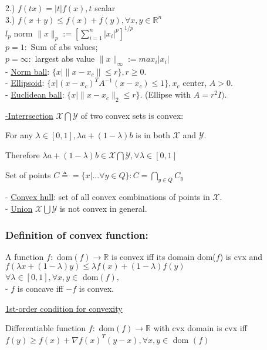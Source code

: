 \documentclass[10pt,parskip]{scrartcl}
\begin{document}
\begin{multicols*}{3}
 2.) $f(tx) = |t|f(x), t$ scalar\\
 3.) $f(x+y)\leq f(x) + f(y), \forall x, y \in \mathbb R^n$\\
 \hspace*{8mm}$l_p$ norm $\|x\|_p := [\sum_{i=1}^n |x_i|^p]^{1/p}$\\
  \hspace*{5mm}$p=1:$ Sum of abs values;\\
  \hspace*{5mm}$p=\infty:$ largest abs value $\|x\|_\infty:=max_i|x_i|$\\
- \underline{Norm ball}: $\{x | \| x-x_c\| \leq r\}, r \geq 0.$\\
- \underline{Ellipsoid}: $\{x | (x-x_c)^T A^{-1} (x-x_c)\leq 1\}, x_c$ center, $A>0$.\\
- \underline{Euclidean ball}: $\{x | \| x-x_c\|_2 \leq r\}$. (Ellipse with $A = r^2 I)$.


\underline{-Interrsection} $\mathcal X \bigcap \mathcal Y$ of two convex sets is convex:


For any $\lambda \in [0,1], \lambda a + (1-\lambda)b$ is in both $\mathcal X$ and $ \mathcal Y$. 

Therefore $\lambda a + (1-\lambda)b \in \mathcal X \bigcap \mathcal Y,  \forall \lambda \in [0,1]$ 

Set of points $ C \triangleq = \{x| ... \forall y \in Q\}: C = \bigcap_{y \in Q} C_y$

- \underline{Convex hull}: set of all convex combinations of points in $\mathcal X$.\\
- \underline{Union} $\mathcal X \bigcup \mathcal Y$ is not convex in general.


\subsubsection{Definition of convex function:}
A function $f :$ dom$(f) \rightarrow \mathbb R$ is convex iff its domain dom($f$) is cvx and
$ f( \lambda x + (1-\lambda) y) \leq \lambda f(x) + (1-\lambda) f(y)$\\
\hspace*{8mm}$  \forall \lambda \in [0,1], \forall x,y \in $ dom$(f),$\\
- $f$ is concave iff $-f$ is convex.

\underline{1st-order condition for convexity}

Differentiable function $f:$ dom$(f) \rightarrow \mathbb R$ with cvx domain is cvx iff $f(y)\geq f(x) + \nabla f(x)^T (y-x), \forall x,y \in $ dom $(f)$



\end{multicols*}
\end{document}
